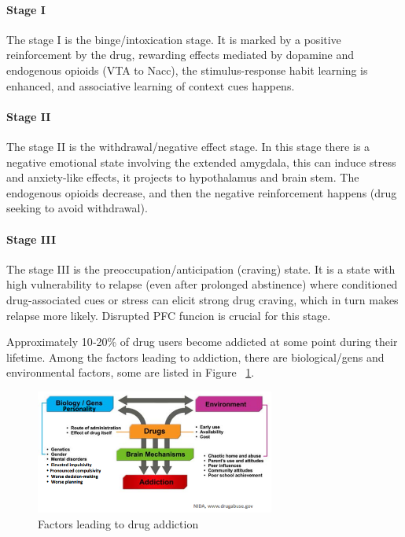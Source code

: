 \documentclass[12pt,article,oneside,a4paper]{memoir}
\begin{document}
\paragraph{Stage I}
The stage I is the binge/intoxication stage. It is marked by a positive
reinforcement by the drug, rewarding effects mediated by dopamine and endogenous
opioids (VTA to Nacc), the stimulus-response habit learning is enhanced, and
associative learning of context cues happens.

\paragraph{Stage II}
The stage II is the withdrawal/negative effect stage. In this stage there is
a negative emotional state involving the extended amygdala, this can induce
stress and anxiety-like effects, it projects to hypothalamus and brain stem.
The endogenous opioids decrease, and then the negative reinforcement happens
(drug seeking to avoid withdrawal).

\paragraph{Stage III}
The stage III is the preoccupation/anticipation (craving) state. It is a state
with high vulnerability to relapse (even after prolonged abstinence) where
conditioned drug-associated cues or stress can elicit strong drug craving, which
in turn makes relapse more likely. Disrupted PFC funcion is crucial for this stage.

Approximately 10‐20\% of drug users become addicted at some point during their
lifetime. Among the factors leading to addiction, there are biological/gens and
environmental factors, some are listed in Figure ~\ref{fig:drug-addiction-factors}.

\begin{figure}
  \centering
  \includegraphics[width=0.7\textwidth]{imgs/drug-addiction-factors.png}
  \caption{Factors leading to drug addiction}
  \label{fig:drug-addiction-factors}
\end{figure}
\end{document}
